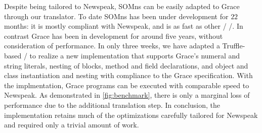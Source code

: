 Despite being tailored to Newspeak, SOMns can be easily adapted to Grace through our translator. To date SOMns has been under development for $22$ months: it is mostly compliant with Newspeak, and is as fast as other \JITing/ \VMs/. In contrast Grace has been in development for around five years, without consideration of performance. In only three weeks, we have adapted a Truffle-based \VM/ to realize a new implementation that supports Grace's numeral and string literals, nesting of blocks, method and field declarations, and object and class instantiation and nesting with compliance to the Grace specification\footnotemark.  With the implmentation, Grace programs can be executed with comparable speed to Newspeak. As demonstrated in \autoref{fig:benchmark}, there is only a marginal loss of performance due to the additional translation step. In conclusion, the implementation retains much of the optimizations carefully tailored for Newspeak and required only a trivial amount of work.



